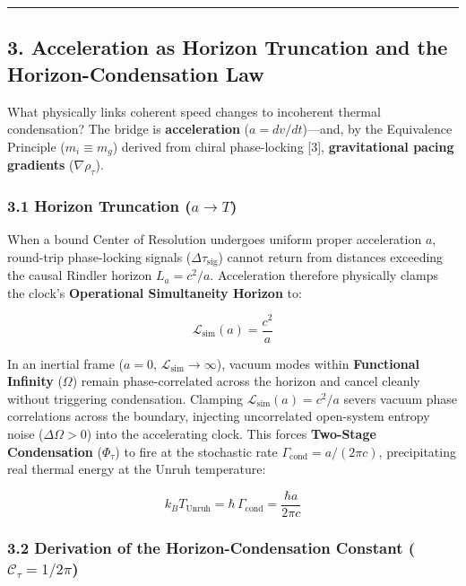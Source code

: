 \documentclass[
]{article}
\begin{document}
\begin{center}\rule{0.5\linewidth}{0.5pt}\end{center}

\subsection{3. Acceleration as Horizon Truncation and the
Horizon-Condensation
Law}\label{acceleration-as-horizon-truncation-and-the-horizon-condensation-law}

What physically links coherent speed changes to incoherent thermal
condensation? The bridge is \textbf{acceleration} (\(a = dv/dt\))---and,
by the Equivalence Principle (\(m_i \equiv m_g\)) derived from chiral
phase-locking {[}3{]}, \textbf{gravitational pacing gradients}
(\(\nabla \rho_\tau\)).

\subsubsection{\texorpdfstring{3.1 Horizon Truncation
(\(a \to T\))}{3.1 Horizon Truncation (a \textbackslash to T)}}\label{horizon-truncation-a-to-t}

When a bound Center of Resolution undergoes uniform proper acceleration
\(a\), round-trip phase-locking signals (\(\Delta\tau_{\mathrm{sig}}\))
cannot return from distances exceeding the causal Rindler horizon
\(L_a = c^2 / a\). Acceleration therefore physically clamps the clock's
\textbf{Operational Simultaneity Horizon} to:

\[\mathcal{L}_{\mathrm{sim}}(a) = \frac{c^2}{a}\]

In an inertial frame (\(a = 0\),
\(\mathcal{L}_{\mathrm{sim}} \to \infty\)), vacuum modes within
\textbf{Functional Infinity} (\(\Omega\)) remain phase-correlated across
the horizon and cancel cleanly without triggering condensation. Clamping
\(\mathcal{L}_{\mathrm{sim}}(a) = c^2/a\) severs vacuum phase
correlations across the boundary, injecting uncorrelated open-system
entropy noise (\(\Delta\Omega > 0\)) into the accelerating clock. This
forces \textbf{Two-Stage Condensation} (\(\Phi_\tau\)) to fire at the
stochastic rate \(\Gamma_{\mathrm{cond}} = a / (2\pi c)\), precipitating
real thermal energy at the Unruh temperature:

\[k_B T_{\mathrm{Unruh}} = \hbar\,\Gamma_{\mathrm{cond}} = \frac{\hbar a}{2\pi c}\]

\subsubsection{\texorpdfstring{3.2 Derivation of the
Horizon-Condensation Constant
(\(\mathcal{C}_\tau = 1/2\pi\))}{3.2 Derivation of the Horizon-Condensation Constant (\textbackslash mathcal\{C\}\_\textbackslash tau = 1/2\textbackslash pi)}}\label{derivation-of-the-horizon-condensation-constant-mathcalc_tau-12pi}
\end{document}
